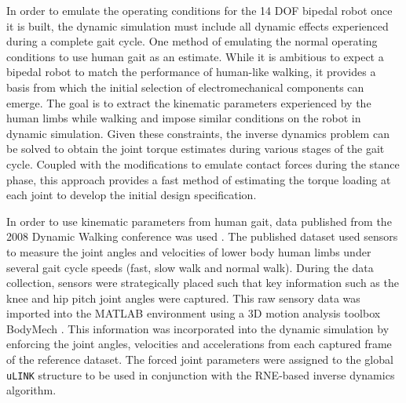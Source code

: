 In order to emulate the operating conditions for the 14 DOF bipedal robot once it is built, the dynamic simulation must include all dynamic effects experienced during a complete gait cycle. One method of emulating the normal operating conditions to use human gait as an estimate. While it is ambitious to expect a bipedal robot to match the performance of human-like walking, it provides a basis from which the initial selection of electromechanical components can emerge. The goal is to extract the kinematic parameters experienced by the human limbs while walking and impose similar conditions on the robot in dynamic simulation. Given these constraints, the inverse dynamics problem can be solved to obtain the joint torque estimates during various stages of the gait cycle. Coupled with the modifications to emulate contact forces during the stance phase, this approach provides a fast method of estimating the torque loading at each joint to develop the initial design specification. 
	
In order to use kinematic parameters from human gait, data published from the 2008 Dynamic Walking conference was used \cite{dw2008}. The published dataset used sensors to measure the joint angles and velocities of lower body human limbs under several gait cycle speeds (fast, slow walk and normal walk). During the data collection, sensors were strategically placed such that key information such as the knee and hip pitch joint angles were captured. This raw sensory data was imported into the MATLAB environment using a 3D motion analysis toolbox BodyMech \cite{bodymech}. This information was incorporated into the dynamic simulation by enforcing the joint angles, velocities and accelerations from each captured frame of the reference dataset. The forced joint parameters were assigned to the global \texttt{uLINK} structure to be used in conjunction with the RNE-based inverse dynamics algorithm. 

